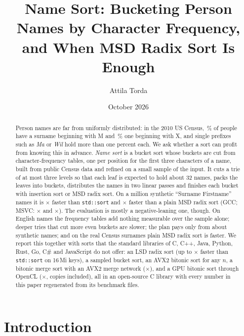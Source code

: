 \documentclass[11pt]{article}
\title{Name Sort: Bucketing Person Names by Character Frequency,\\
and When MSD Radix Sort Is Enough}
\author{Attila Torda}
\date{October 2026}
\theoremstyle{definition}
\begin{document}
\maketitle

\begin{abstract}
Person names are far from uniformly distributed: in the 2010 US Census,
\,\% of people have a surname beginning with M and
\,\% one beginning with X, and single prefixes such as
\emph{Ma} or \emph{Wil} hold more than one percent each. We ask whether a
sort can profit from knowing this in advance. \emph{Name sort} is a bucket
sort whose buckets are cut from character-frequency tables, one per
position for the first three characters of a name, built from public Census
data and refined on a small sample of the input. It cuts a trie of at most
three levels so that each leaf is expected to hold about 32 names, packs the
leaves into buckets, distributes the names in two linear passes and finishes
each bucket with insertion sort or MSD radix sort. On a million synthetic
``Surname Firstname'' names it is $\times$ faster
than \texttt{std::sort} and $\times$ faster than a
plain MSD radix sort (GCC; MSVC: $\times$ and
$\times$). The evaluation is mostly a
negative-leaning one, though. On English names the frequency tables add
nothing measurable over the sample alone; deeper tries that cut more even
buckets are slower; the plan pays only from about 
synthetic names; and on the  real Census surnames plain MSD
radix sort is faster. We
report this together with sorts that the standard libraries of C, C++, Java,
Python, Rust, Go, C\# and JavaScript do not offer: an LSD radix sort (up to
$\times$ faster than
\texttt{std::sort} on 16\,Mi keys), a sampled bucket sort, an AVX2 bitonic
sort for any $n$, a bitonic merge sort with an AVX2 merge network
($\times$), and a GPU bitonic
sort through OpenCL ($\times$,
copies included), all in an open-source C library with every number in this
paper regenerated from its benchmark files.
\end{abstract}

\section{Introduction}
\end{document}
